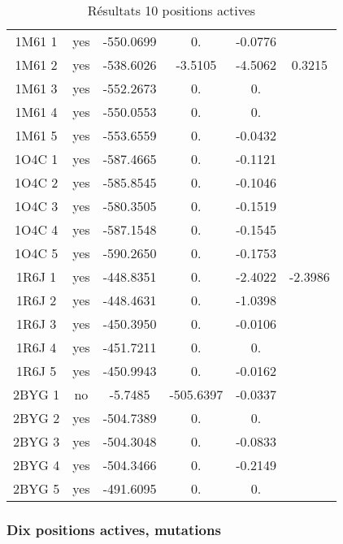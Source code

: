\begin{table}[h]
\begin{tabular}{cccccc}
        1M61 1 & yes & -550.0699 & 0. & -0.0776 & \\
        1M61 2 & yes & -538.6026 & -3.5105 & -4.5062 & 0.3215 \\
        1M61 3 & yes & -552.2673 & 0. & 0. & \\
        1M61 4 & yes & -550.0553 & 0. & 0. & \\
        1M61 5 & yes & -553.6559 & 0. & -0.0432 & \\
        1O4C 1 & yes & -587.4665 & 0. & -0.1121 & \\
        1O4C 2 & yes & -585.8545 & 0. & -0.1046 & \\
        1O4C 3 & yes & -580.3505 & 0. & -0.1519 & \\
        1O4C 4 & yes & -587.1548 & 0. & -0.1545 & \\
        1O4C 5 & yes & -590.2650 & 0. & -0.1753 & \\
        1R6J 1 & yes & -448.8351 & 0. & -2.4022 & -2.3986 \\
        1R6J 2 & yes & -448.4631 & 0. & -1.0398 & \\
        1R6J 3 & yes & -450.3950 & 0. & -0.0106 & \\
        1R6J 4 & yes & -451.7211 & 0. & 0. & \\
        1R6J 5 & yes & -450.9943 & 0. & -0.0162 & \\
        2BYG 1 & no  & -5.7485   & -505.6397 & -0.0337 & \\
        2BYG 2 & yes & -504.7389 & 0. & 0. & \\
        2BYG 3 & yes & -504.3048 & 0. & -0.0833 & \\
        2BYG 4 & yes & -504.3466 & 0. & -0.2149 & \\
        2BYG 5 & yes & -491.6095 & 0. & 0. & \\
        
        \bottomrule


 \end{tabular}      
 \caption{Résultats 10 positions actives }
\label{tab:result_10_actives}
\end{table}

   \subsubsection{Dix positions actives, mutations}



